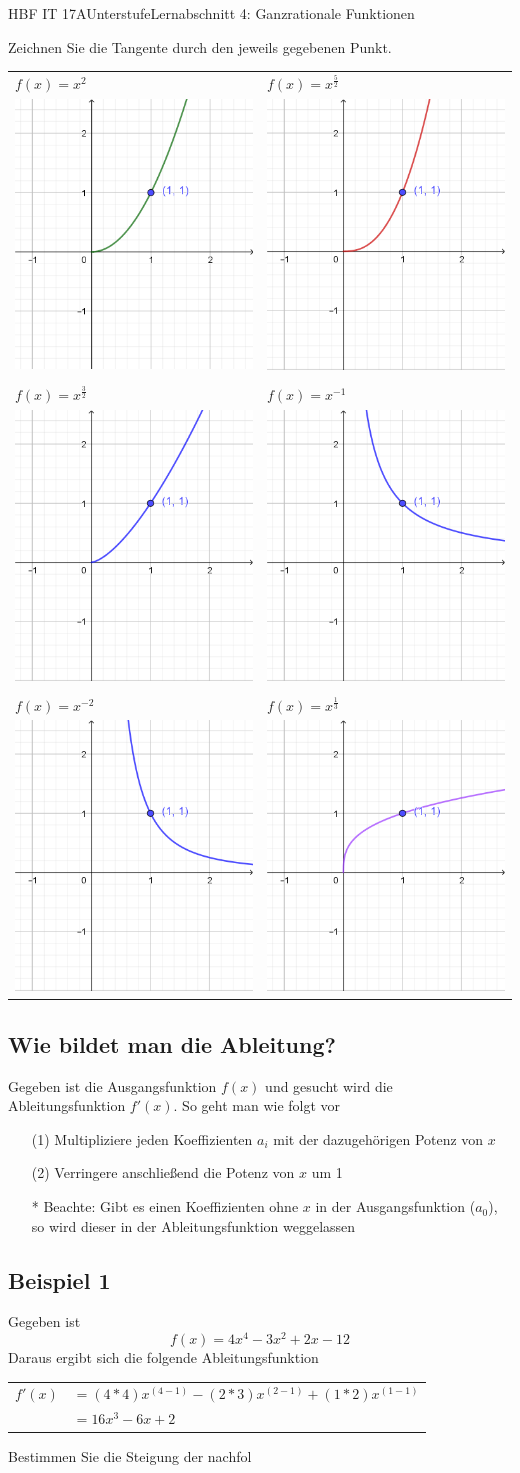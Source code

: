 \documentclass[oneside,openany,headings=optiontotoc,11pt,numbers=noenddot]{scrreprt}
\begin{document}
	\begin{worksheet}{HBF IT 17A}{Unterstufe}{Lernabschnitt 4: Ganzrationale Funktionen}
		
		\noindent
		\begin{framed}
			\noindent
			Zeichnen Sie die Tangente durch den jeweils gegebenen Punkt.
			\begin{center}
				\begin{tabularx}{\textwidth}{XX}
					\(f(x) = x^2\) & \(f(x) = x^{\frac{5}{2}}\)\\
					\includegraphics[scale=0.3]{Bilder/A.png} & \includegraphics[scale=0.3]{Bilder/B.png}\\
					\hline\\
					\(f(x)=x^{\frac{3}{2}}\) & \(f(x) = x^{-1}\)\\
					\includegraphics[scale=0.3]{Bilder/C.png} & \includegraphics[scale=0.3]{Bilder/D.png}\\
					\hline\\
					\(f(x) = x^{-2}\) & \(f(x) = x^{\frac{1}{3}}\)\\		
					\includegraphics[scale=0.3]{Bilder/G.png} & \includegraphics[scale=0.3]{Bilder/Fu.png}\\
				\end{tabularx}
			\end{center}
		\end{framed}
		\newpage
		\noindent
		\begin{framed}
			\section*{Wie bildet man die Ableitung?}
			Gegeben ist die Ausgangsfunktion \(f(x)\) und gesucht wird die Ableitungsfunktion \(f'(x)\). So geht man wie folgt vor
			\begin{itemize}
				\item[(1)] Multipliziere jeden Koeffizienten \(a_i\) mit der dazugehörigen Potenz von \(x\)
				\item[(2)] Verringere anschließend die Potenz von \(x\) um 1
				\item[*] Beachte: Gibt es einen Koeffizienten ohne \(x\) in der Ausgangsfunktion (\(a_0\)), so wird dieser in der Ableitungsfunktion weggelassen
			\end{itemize}
			\subsection*{Beispiel 1}
			Gegeben ist	\[f(x) = 4x^{4} - 3x^2 + 2x -12\]
			Daraus ergibt sich die folgende Ableitungsfunktion
			\begin{center}
				\begin{tabular}{cl}
					\(f'(x)\) & \(= (4*4)x^{(4-1)} - (2*3)x^{(2-1)} + (1*2)x^{(1-1)}\)\\
					& \(= 16x^3 -6x + 2\)
				\end{tabular}
			\end{center}
		\end{framed}
		\begin{framed}
			Bestimmen Sie die Steigung der nachfol
\end{framed}
\end{worksheet}
\end{document}
